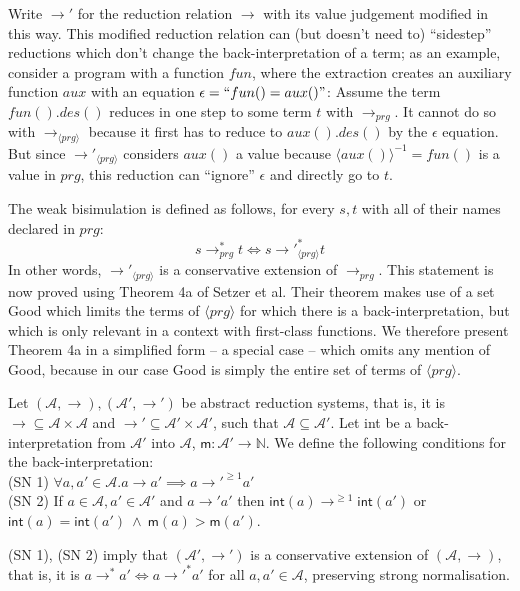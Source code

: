 Write $\longrightarrow'$ for the reduction relation $\longrightarrow$ with its value judgement modified in this way. This modified reduction relation can (but doesn't need to) ``sidestep'' reductions which don't change the back-interpretation of a term; as an example, consider a program with a function $fun$, where the extraction creates an auxiliary function $aux$ with an equation $\epsilon = ``fun() = aux()"$: Assume the term $fun().des()$ reduces in one step to some term $t$ with $\longrightarrow_{prg}$. It cannot do so with $\longrightarrow_{\langle prg \rangle}$ because it first has to reduce to $aux().des()$ by the $\epsilon$ equation. But since $\longrightarrow'_{\langle prg \rangle}$ considers $aux()$ a value because $\langle aux() \rangle^{-1} = fun()$ is a value in $prg$, this reduction can ``ignore'' $\epsilon$ and directly go to $t$.

The weak bisimulation is defined as follows, for every $s,t$ with all of their names declared in $prg$:
\begin{equation}
\label{eq:bisim1}
s \longrightarrow_{prg}^* t \iff s {\longrightarrow'}_{\langle prg \rangle}^* t
\end{equation}
In other words, $\longrightarrow'_{\langle prg \rangle}$ is a conservative extension of $\longrightarrow_{prg}$. This statement is now proved using Theorem 4a of Setzer et al.\cite{setzer14unnesting} Their theorem makes use of a set \textsf{Good} which limits the terms of $\langle prg \rangle$ for which there is a back-interpretation, but which is only relevant in a context with first-class functions. We therefore present Theorem 4a in a simplified form -- a special case -- which omits any mention of \textsf{Good}, because in our case \textsf{Good} is simply the entire set of terms of $\langle prg \rangle$.

\begin{theorem}[Setzer et al.]
\label{thm:setzer4a}
Let $(\mathcal{A}, \longrightarrow), (\mathcal{A}', \longrightarrow')$ be abstract reduction systems, that is, it is $\longrightarrow \subseteq \mathcal{A} \times \mathcal{A}$ and $\longrightarrow' \subseteq \mathcal{A}' \times \mathcal{A}'$, such that $\mathcal{A} \subseteq \mathcal{A}'$. Let \textsf{int} be a back-interpretation from $\mathcal{A}'$ into $\mathcal{A}$, $\textsf{m} : \mathcal{A}' \to \mathbb{N}$. We define the following conditions for the back-interpretation:\\
(SN 1) $\forall a, a' \in \mathcal{A}. a \longrightarrow a' \implies a {\longrightarrow'}^{\geq 1} a'$\\
(SN 2) If $a \in \mathcal{A}, a' \in \mathcal{A}'$ and $a \longrightarrow' a'$ then $\textsf{int}(a) {\longrightarrow}^{\geq 1} \textsf{int}(a')$ or $\textsf{int}(a) = \textsf{int}(a') ~ \land ~ \textsf{m}(a) > \textsf{m}(a')$.

(SN 1), (SN 2) imply that $(\mathcal{A}', \longrightarrow')$ is a conservative extension of $(\mathcal{A}, \longrightarrow)$, that is, it is $a \longrightarrow^* a' \iff a {\longrightarrow'}^* a'$ for all $a, a' \in \mathcal{A}$, preserving strong normalisation.
\end{theorem}

